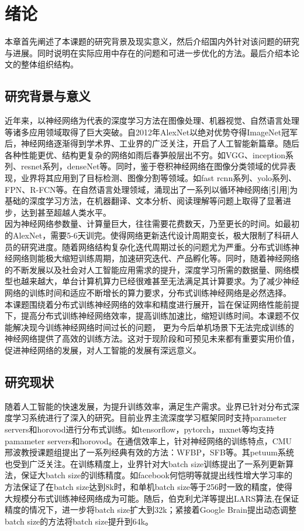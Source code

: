 \chapter{绪论}
本章首先阐述了本课题的研究背景及现实意义，然后介绍国内外针对该问题的研究与进展。同时说明在实际应用中存在的问题和可进一步优化的方法。最后介绍本论文的整体组织结构。
\section{研究背景与意义}
近年来，以神经网络为代表的深度学习方法在图像处理、机器视觉、自然语言处理等诸多应用领域取得了巨大突破。自2012年AlexNet以绝对优势夺得ImageNet冠军后，神经网络逐渐得到学术界、工业界的广泛关注，开启了人工智能新篇章。随后各种性能更优、结构更复杂的网络如雨后春笋般层出不穷。如VGG、inception系列、resnet系列，denseNet等。同时，鉴于卷积神经网络在图像分类领域的优异表现，业界将其应用到了目标检测、图像分割等领域。如fast rcnn系列、yolo系列、FPN、R-FCN等。在自然语言处理领域，涌现出了一系列以循环神经网络[引用]为基础的深度学习方法，在机器翻译、文本分析、阅读理解等问题上取得了显著进步，达到甚至超越人类水平。\\
因为神经网络参数量、计算量巨大，往往需要花费数天，乃至更长的时间。如最初的AlexNet，需要5-6天训完。使得网络更新迭代设计周期变长，极大限制了科研人员的研究进度。随着网络结构复杂化迭代周期过长的问题尤为严重。分布式训练神经网络则能极大缩短训练周期，加速研究迭代、产品孵化等。同时，随着神经网络的不断发展以及社会对人工智能应用需求的提升，深度学习所需的数据量、网络模型也越来越大，单台计算机算力已经很难甚至无法满足其计算要求。为了减少神经网络的训练时间和适应不断增长的算力要求，分布式训练神经网络是必然选择。\\
本课题围绕着分布式训练神经网络的效率和精度进行展开，旨在保证网络性能前提下，提高分布式训练神经网络效率，提高训练加速比，缩短训练时间。本课题不仅能解决现今训练神经网络时间过长的问题， 更为今后单机场景下无法完成训练的神经网络提供了高效的训练方法。这对于现阶段和可预见未来都有重要实用价值，促进神经网络的发展，对人工智能的发展有深远意义。

\section{研究现状}
随着人工智能的快速发展，为提升训练效率，满足生产需求。业界已针对分布式深度学习系统进行了深入的研究。目前业界主流深度学习框架同时支持parameter servers和horovod进行分布式训练。如tensorflow，pytorch，mxnet等均支持pamameter servers和horovod。在通信效率上，针对神经网络的训练特点，CMU邢波教授课题组提出了一系列经典有效的方法：WFBP，SFB等。其petuum系统也受到广泛关注。在训练精度上，业界针对大batch size训练提出了一系列更新算法，保证大batch size的训练精度。如facebook何恺明等就提出线性增大学习率的方法保证了在batch size达到8k时，和单机batch size等于256时一致的精度，使得大规模分布式训练神经网络成为可能。随后，伯克利尤洋等提出LARS算法,在保证精度的情况下，进一步将batch size扩大到32k；紧接着Google Brain提出动态调整batch size的方法将batch size提升到64k。
